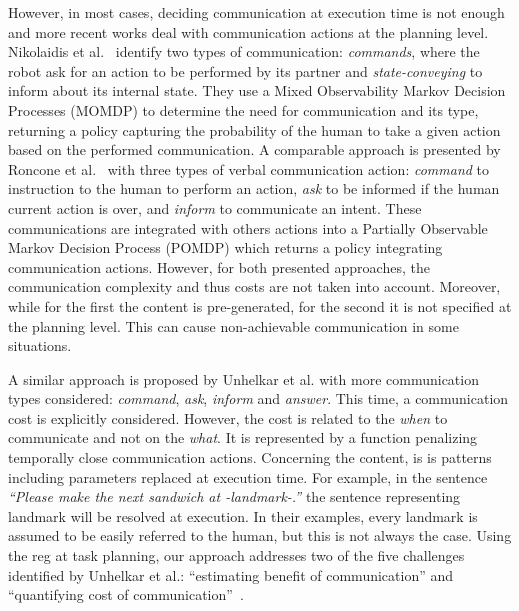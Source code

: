 However, in most cases, deciding communication at execution time is not enough and more recent works deal with communication actions at the planning level. Nikolaidis et al.~\cite{nikolaidis_2018_planning} identify two types of communication: \textit{commands}, where the robot ask for an action to be performed by its partner and \textit{state-conveying} to inform about its internal state. They use a Mixed Observability Markov Decision Processes (MOMDP) to determine the need for communication and its type, returning a policy capturing the probability of the human to take a given action based on the performed communication. A comparable approach is presented by Roncone et al.~\cite{roncone_2017_transparent} with three types of verbal communication action: \textit{command} to instruction to the human to perform an action, \textit{ask} to be informed if the human current action is over, and \textit{inform} to communicate an intent. These communications are integrated with others actions into a Partially Observable Markov Decision Process (POMDP) which returns a policy integrating communication actions. However, for both presented approaches, the communication complexity and thus costs are not taken into account. Moreover, while for the first the content is pre-generated, for the second it is not specified at the planning level. This can cause non-achievable communication in some situations.

A similar approach is proposed by Unhelkar et al. \cite{unhelkar_2020_decision} with more communication types considered: \textit{command}, \textit{ask}, \textit{inform} and \textit{answer}. This time, a communication cost is explicitly considered. However, the cost is related to the \textit{when} to communicate and not on the \textit{what}. It is represented by a function penalizing temporally close communication actions. Concerning the content, is is patterns including parameters replaced at execution time. For example, in the sentence \textit{“Please make the next sandwich at -landmark-.”} the sentence representing landmark will be resolved at execution. In their examples, every landmark is assumed to be easily referred to the human, but this is not always the case. Using the \acrshort{reg} at task planning, our approach addresses two of the five challenges identified by Unhelkar et al.: ``estimating benefit of communication'' and ``quantifying cost of communication''~\cite{unhelkar_2017_challenges}.


